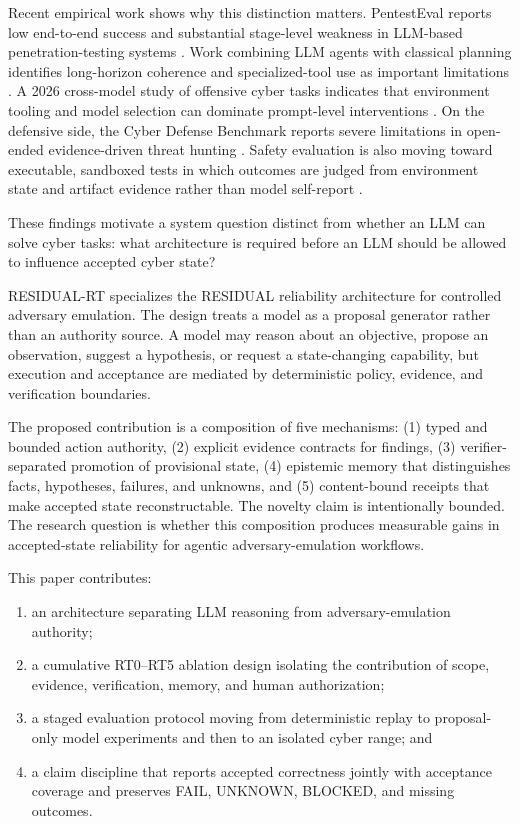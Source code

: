 \documentclass[conference]{IEEEtran}
\begin{document}
Recent empirical work shows why this distinction matters. PentestEval reports low end-to-end success and substantial stage-level weakness in LLM-based penetration-testing systems \cite{penteval}. Work combining LLM agents with classical planning identifies long-horizon coherence and specialized-tool use as important limitations \cite{checkmate}. A 2026 cross-model study of offensive cyber tasks indicates that environment tooling and model selection can dominate prompt-level interventions \cite{merves}. On the defensive side, the Cyber Defense Benchmark reports severe limitations in open-ended evidence-driven threat hunting \cite{cyberdefense}. Safety evaluation is also moving toward executable, sandboxed tests in which outcomes are judged from environment state and artifact evidence rather than model self-report \cite{vera}.

These findings motivate a system question distinct from whether an LLM can solve cyber tasks: what architecture is required before an LLM should be allowed to influence accepted cyber state?

RESIDUAL-RT specializes the RESIDUAL reliability architecture for controlled adversary emulation. The design treats a model as a proposal generator rather than an authority source. A model may reason about an objective, propose an observation, suggest a hypothesis, or request a state-changing capability, but execution and acceptance are mediated by deterministic policy, evidence, and verification boundaries.

The proposed contribution is a composition of five mechanisms: (1) typed and bounded action authority, (2) explicit evidence contracts for findings, (3) verifier-separated promotion of provisional state, (4) epistemic memory that distinguishes facts, hypotheses, failures, and unknowns, and (5) content-bound receipts that make accepted state reconstructable. The novelty claim is intentionally bounded. The research question is whether this composition produces measurable gains in accepted-state reliability for agentic adversary-emulation workflows.

This paper contributes:
\begin{enumerate}[leftmargin=*]
\item an architecture separating LLM reasoning from adversary-emulation authority;
\item a cumulative RT0--RT5 ablation design isolating the contribution of scope, evidence, verification, memory, and human authorization;
\item a staged evaluation protocol moving from deterministic replay to proposal-only model experiments and then to an isolated cyber range; and
\item a claim discipline that reports accepted correctness jointly with acceptance coverage and preserves FAIL, UNKNOWN, BLOCKED, and missing outcomes.
\end{enumerate}
\end{document}
